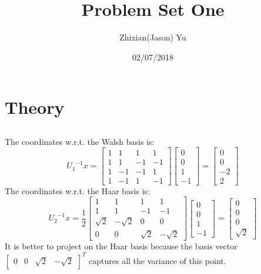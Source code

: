 \documentclass{article}
\title{Problem Set One}
\date{02/07/2018}
\author{Zhixian(Jason) Yu}
\begin{document}
\maketitle
{}
\newpage

\section{Theory}
\subsection{}
The coordinates w.r.t. the Walsh basis is:
\begin{equation*}
{U_1}^{-1} x = 
\left[\begin{matrix}
1 & 1 & 1 & 1 \\
1 & 1 & -1 & -1 \\
1 & -1 & -1 & 1 \\
1 & -1 & 1 & -1
\end{matrix}
\right]
\left[\begin{matrix}
0 \\
0 \\
1 \\
-1
\end{matrix}
\right] = \begin{bmatrix}
0\\
0\\
-2\\
2
\end{bmatrix}
\end{equation*}
The coordinates w.r.t. the Haar basis is:
\begin{equation*}
{U_2}^{-1} x = \frac{1}{2}
\left[\begin{matrix}
1 & 1 & 1 & 1 \\
1 & 1 & -1 & -1 \\
\sqrt{2} & -\sqrt{2} & 0 & 0 \\
0 & 0 & \sqrt{2} & -\sqrt{2}
\end{matrix}
\right]
\left[\begin{matrix}
0 \\
0 \\
1 \\
-1
\end{matrix}
\right] = \begin{bmatrix}
0\\
0\\
0\\
\sqrt{2}
\end{bmatrix}
\end{equation*}
It is better to project on the Haar basis because the basis vector $\left[\begin{matrix}
0 & 0 & \sqrt{2} & -\sqrt{2} \end{matrix}\right]^T$ captures all the variance of this point.
\end{document}
